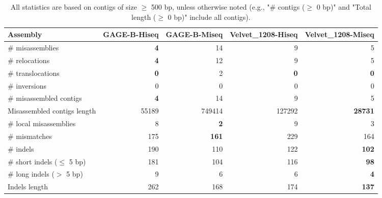 \documentclass[12pt,a4paper]{article}
\begin{document}
\begin{table}[ht]
\begin{center}
\caption{All statistics are based on contigs of size $\geq$ 500 bp, unless otherwise noted (e.g., "\# contigs ($\geq$ 0 bp)" and "Total length ($\geq$ 0 bp)" include all contigs).}
\begin{tabular}{|l*{4}{|r}|}
\hline
Assembly & GAGE-B-Hiseq & GAGE-B-Miseq & Velvet\_1208-Hiseq & Velvet\_1208-Miseq \\ \hline
\# misassemblies & {\bf 4} & 14 & 9 & 5 \\ \hline
\hspace{5mm}\# relocations & {\bf 4} & 12 & 9 & 5 \\ \hline
\hspace{5mm}\# translocations & {\bf 0} & 2 & {\bf 0} & {\bf 0} \\ \hline
\hspace{5mm}\# inversions & 0 & 0 & 0 & 0 \\ \hline
\# misassembled contigs & {\bf 4} & 14 & 9 & 5 \\ \hline
Misassembled contigs length & 55189 & 749414 & 127292 & {\bf 28731} \\ \hline
\# local misassemblies & 8 & {\bf 2} & 9 & 3 \\ \hline
\# mismatches & 175 & {\bf 161} & 229 & 164 \\ \hline
\# indels & 190 & 110 & 122 & {\bf 102} \\ \hline
\hspace{5mm}\# short indels ($\leq$ 5 bp) & 181 & 104 & 116 & {\bf 98} \\ \hline
\hspace{5mm}\# long indels ($>$ 5 bp) & 9 & 6 & 6 & {\bf 4} \\ \hline
Indels length & 262 & 168 & 174 & {\bf 137} \\ \hline
\end{tabular}
\end{center}
\end{table}
\end{document}
